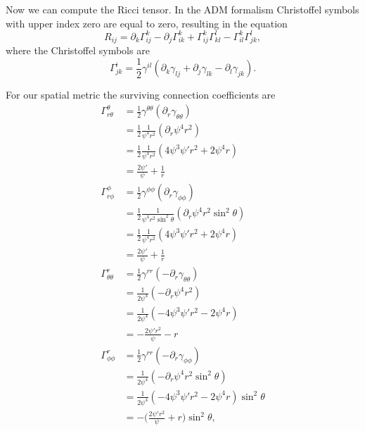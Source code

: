 \documentclass[12pt]{article}
\numberwithin{equation}{section}
\begin{document}
Now we can compute the Ricci tensor.  In the ADM formalism Christoffel symbols with upper index zero are equal to zero, resulting in the equation
\begin{equation}
R_{ij} = \partial_k \Gamma^k_{ij} - \partial_j \Gamma^k_{ik} + \Gamma^k_{ij} \Gamma^l_{kl} - \Gamma^k_{il} \Gamma^l_{jk},
\end{equation}
where the Christoffel symbols are
\begin{equation}
\Gamma^i_{jk} = \frac{1}{2} \gamma^{il} (\partial_k \gamma_{lj} + \partial_j \gamma_{lk} - \partial_l \gamma_{jk}).
\end{equation}

For our spatial metric the surviving connection coefficients are
\begin{equation}
\begin{aligned}
\Gamma^{\theta}_{r \theta} &= \frac{1}{2} \gamma^{\theta \theta} (\partial_r \gamma_{\theta \theta}) \\
&= \frac{1}{2} \frac{1}{\psi^4 r^2} (\partial_r \psi^4 r^2) \\
&= \frac{1}{2} \frac{1}{\psi^4 r^2} (4 \psi^3 \psi' r^2 + 2 \psi^4 r) \\
&= \frac{2 \psi'}{\psi}  + \frac{1}{r} \\
\Gamma^{\phi}_{r \phi} &= \frac{1}{2} \gamma^{\phi \phi} (\partial_r \gamma_{\phi \phi}) \\
&= \frac{1}{2} \frac{1}{\psi^4 r^2 \sin^2 \theta} (\partial_r \psi^4 r^2 \sin^2 \theta) \\
&= \frac{1}{2} \frac{1}{\psi^4 r^2} (4 \psi^3 \psi' r^2 + 2 \psi^4 r) \\
&= \frac{2 \psi'}{\psi} + \frac{1}{r} \\
\Gamma^r_{\theta \theta} &= \frac{1}{2} \gamma^{r r} (- \partial_r \gamma_{\theta \theta}) \\
&= \frac{1}{2 \psi^4} (- \partial_r \psi^4 r^2 ) \\
&= \frac{1}{2 \psi^4} (- 4 \psi^3 \psi' r^2 - 2 \psi^4 r ) \\
&= - \frac{2 \psi' r^2}{\psi} - r \\
\Gamma^r_{\phi \phi} &= \frac{1}{2} \gamma^{r r} ( - \partial_r \gamma_{\phi \phi}) \\
&= \frac{1}{2 \psi^4} ( - \partial_r \psi^4 r^2 \sin^2 \theta) \\
&= \frac{1}{2 \psi^4} ( - 4 \psi^3 \psi' r^2 - 2 \psi^4 r ) \sin^2 \theta \\
&= - \Big( \frac{2 \psi' r^2}{\psi} + r \Big) \sin^2 \theta, \\
\end{aligned}
\end{equation}
\end{document}
